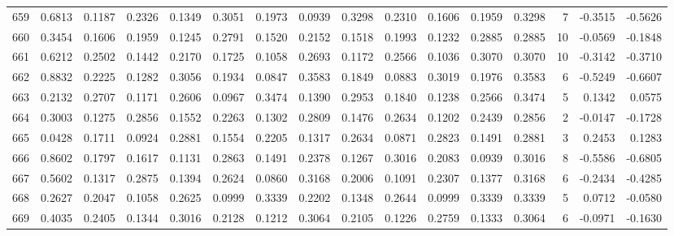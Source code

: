 \begin{tabular}{lrrrrrrrrrrrrrrr}
659 &      0.6813 &  0.1187 &  0.2326 &  0.1349 &  0.3051 &  0.1973 &  0.0939 &  0.3298 &  0.2310 &  0.1606 &   0.1959 &     0.3298 &      7 &                   -0.3515 &                    -0.5626 \\
660 &      0.3454 &  0.1606 &  0.1959 &  0.1245 &  0.2791 &  0.1520 &  0.2152 &  0.1518 &  0.1993 &  0.1232 &   0.2885 &     0.2885 &     10 &                   -0.0569 &                    -0.1848 \\
661 &      0.6212 &  0.2502 &  0.1442 &  0.2170 &  0.1725 &  0.1058 &  0.2693 &  0.1172 &  0.2566 &  0.1036 &   0.3070 &     0.3070 &     10 &                   -0.3142 &                    -0.3710 \\
662 &      0.8832 &  0.2225 &  0.1282 &  0.3056 &  0.1934 &  0.0847 &  0.3583 &  0.1849 &  0.0883 &  0.3019 &   0.1976 &     0.3583 &      6 &                   -0.5249 &                    -0.6607 \\
663 &      0.2132 &  0.2707 &  0.1171 &  0.2606 &  0.0967 &  0.3474 &  0.1390 &  0.2953 &  0.1840 &  0.1238 &   0.2566 &     0.3474 &      5 &                    0.1342 &                     0.0575 \\
664 &      0.3003 &  0.1275 &  0.2856 &  0.1552 &  0.2263 &  0.1302 &  0.2809 &  0.1476 &  0.2634 &  0.1202 &   0.2439 &     0.2856 &      2 &                   -0.0147 &                    -0.1728 \\
665 &      0.0428 &  0.1711 &  0.0924 &  0.2881 &  0.1554 &  0.2205 &  0.1317 &  0.2634 &  0.0871 &  0.2823 &   0.1491 &     0.2881 &      3 &                    0.2453 &                     0.1283 \\
666 &      0.8602 &  0.1797 &  0.1617 &  0.1131 &  0.2863 &  0.1491 &  0.2378 &  0.1267 &  0.3016 &  0.2083 &   0.0939 &     0.3016 &      8 &                   -0.5586 &                    -0.6805 \\
667 &      0.5602 &  0.1317 &  0.2875 &  0.1394 &  0.2624 &  0.0860 &  0.3168 &  0.2006 &  0.1091 &  0.2307 &   0.1377 &     0.3168 &      6 &                   -0.2434 &                    -0.4285 \\
668 &      0.2627 &  0.2047 &  0.1058 &  0.2625 &  0.0999 &  0.3339 &  0.2202 &  0.1348 &  0.2644 &  0.0999 &   0.3339 &     0.3339 &      5 &                    0.0712 &                    -0.0580 \\
669 &      0.4035 &  0.2405 &  0.1344 &  0.3016 &  0.2128 &  0.1212 &  0.3064 &  0.2105 &  0.1226 &  0.2759 &   0.1333 &     0.3064 &      6 &                   -0.0971 &                    -0.1630 \\

\end{tabular}
